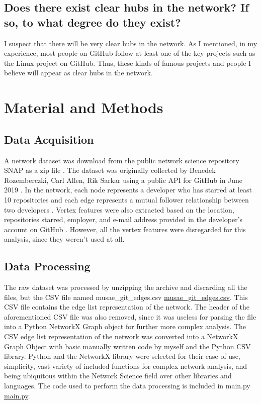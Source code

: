 \documentclass[9pt,twocolumn,twoside]{pnas-new}
\begin{document}
\subsection*{Does there exist clear hubs in the network? If so, to what degree do they exist?}

I suspect that there will be very clear hubs in the network. As I mentioned, in my experience, most people on GitHub follow at least one of the key projects such as the Linux project on GitHub. Thus, these kinds of famous projects and people I believe will appear as clear hubs in the network.

\section*{Material and Methods}

\subsection*{Data Acquisition} A network dataset was download from the public network science repository SNAP as a zip file \cite{rozemberczki2019multiscale}. The dataset was originally collected by Benedek Rozemberczki, Carl Allen, Rik Sarkar using a public API for GitHub in June 2019 \cite{rozemberczki2019multiscale}. In the network, each node represents a developer who has starred at least 10 repositories and each edge represents a mutual follower relationship between two developers \cite{rozemberczki2019multiscale}. Vertex features were also extracted based on the location, repositories starred, employer, and e-mail address provided in the developer’s account on GitHub \cite{rozemberczki2019multiscale}. However, all the vertex features were disregarded for this analysis, since they weren’t used at all.

\subsection*{Data Processing} The raw dataset was processed by unzipping the archive and discarding all the files, but the CSV file named musae\_git\_edges.csv \href{https://github.com/Hockenba/mth450-final-project-report}{musae\_git\_edges.csv}. This CSV file contains the edge list representation of the network. The header of the aforementioned CSV file was also removed, since it was useless for parsing the file into a Python NetworkX Graph object for further more complex analysis. The CSV edge list representation of the network was converted into a NetworkX Graph Object with basic manually written code by myself and the Python CSV library. Python and the NetworkX library were selected for their ease of use, simplicity, vast variety of included functions for complex network analysis, and being ubiquitous within the Network Science field over other libraries and languages. The code used to perform the data processing is included in main.py \href{https://github.com/Hockenba/mth450-final-project-report}{main.py}.
\end{document}
